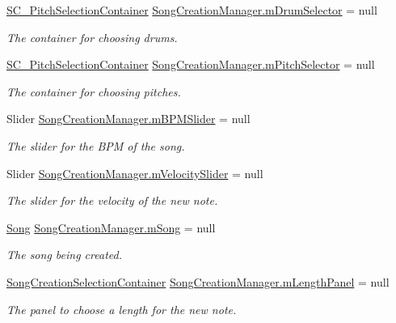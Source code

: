 \begin{DoxyCompactItemize}
\hyperlink{class_s_c___pitch_selection_container}{S\+C\+\_\+\+Pitch\+Selection\+Container} \hyperlink{group___s_c_m_priv_var_gac8be873b8259a0ddf76b4fa6d7d2d072}{Song\+Creation\+Manager.\+m\+Drum\+Selector} = null
\begin{DoxyCompactList}\small\item\em The container for choosing drums. \end{DoxyCompactList}\item 
\hyperlink{class_s_c___pitch_selection_container}{S\+C\+\_\+\+Pitch\+Selection\+Container} \hyperlink{group___s_c_m_priv_var_gab84821120cace4099edfb42c52d2af63}{Song\+Creation\+Manager.\+m\+Pitch\+Selector} = null
\begin{DoxyCompactList}\small\item\em The container for choosing pitches. \end{DoxyCompactList}\item 
Slider \hyperlink{group___s_c_m_priv_var_ga87ac3691ad7848394e51442f29d9659d}{Song\+Creation\+Manager.\+m\+B\+P\+M\+Slider} = null
\begin{DoxyCompactList}\small\item\em The slider for the B\+PM of the song. \end{DoxyCompactList}\item 
Slider \hyperlink{group___s_c_m_priv_var_ga7316e5e8f15d1574fc6cb4bd739bbf0a}{Song\+Creation\+Manager.\+m\+Velocity\+Slider} = null
\begin{DoxyCompactList}\small\item\em The slider for the velocity of the new note. \end{DoxyCompactList}\item 
\hyperlink{class_song}{Song} \hyperlink{group___s_c_m_priv_var_gabd8329149faef65a689650d951a9abc9}{Song\+Creation\+Manager.\+m\+Song} = null
\begin{DoxyCompactList}\small\item\em The song being created. \end{DoxyCompactList}\item 
\hyperlink{group___s_c_m_nest_class_class_song_creation_manager_1_1_song_creation_selection_container}{Song\+Creation\+Selection\+Container} \hyperlink{group___s_c_m_priv_var_gadb8dedf80fbe474a1c94cdc95d088a6f}{Song\+Creation\+Manager.\+m\+Length\+Panel} = null
\begin{DoxyCompactList}\small\item\em The panel to choose a length for the new note. \end{DoxyCompactList}\item 

\end{DoxyCompactItemize}
